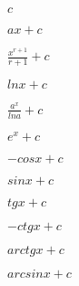 \documentclass[]{article}
\begin{document}
$
c
$

$
ax + c
$

$
\frac{x^{r+1}}{r+1} + c
$

$
lnx + c
$

$
\frac{a^x}{lna} + c
$

$
e^x + c
$

$
-cosx + c
$

$
sinx + c
$

$
tgx + c
$

$
-ctgx + c
$

$
arctgx + c
$

$
arcsinx + c
$
\end{document}
